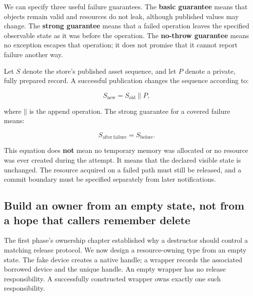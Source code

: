 We can specify three useful failure guarantees. The \textbf{basic guarantee} means that objects remain valid and resources do not leak, although published values may change. The \textbf{strong guarantee} means that a failed operation leaves the specified observable state as it was before the operation. The \textbf{no-throw guarantee} means no exception escapes that operation; it does not promise that it cannot report failure another way.

Let \(S\) denote the store's published asset sequence, and let \(P\) denote a private, fully prepared record. A successful publication changes the sequence according to:

\[
S_{\mathrm{new}} = S_{\mathrm{old}} \mathbin{\|} P,
\]

where \(\mathbin{\|}\) is the append operation. The strong guarantee for a covered failure means:

\[
S_{\mathrm{after\ failure}} = S_{\mathrm{before}}.
\]

This equation does \textbf{not} mean no temporary memory was allocated or no resource was ever created during the attempt. It means that the declared visible state is unchanged. The resource acquired on a failed path must still be released, and a commit boundary must be specified separately from later notifications.

\subsection{Build an owner from an empty state, not from a hope that callers remember delete}\label{01-foundations-i-ch004-build-an-owner-from-an-empty-state-not-from-a-hope-that-callers-remember-delete}

\hypertarget{01-foundations-i-ch004-build-an-owner-from-an-empty-state-not-from-a-hope-that-callers-remember-delete}{}

The first phase's ownership chapter established why a destructor should control a matching release protocol. We now design a resource-owning type from an empty state. The fake device creates a native handle; a wrapper records the associated borrowed device and the unique handle. An empty wrapper has no release responsibility. A successfully constructed wrapper owns exactly one such responsibility.

